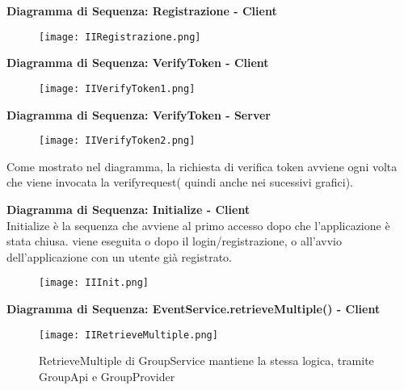 \textbf{Diagramma di Sequenza: Registrazione - Client}\\
\begin{figure}[h!]
    \begin{center}
        \texttt{[image: IIRegistrazione.png]}
    \end{center}
\end{figure}


\textbf{Diagramma di Sequenza: VerifyToken - Client}\\
\begin{figure}[h!]
    \begin{center}
        \texttt{[image: IIVerifyToken1.png]}
    \end{center}
\end{figure}
\clearpage
\textbf{Diagramma di Sequenza: VerifyToken - Server}\\
\begin{figure}[h!]
    \begin{center}
        \texttt{[image: IIVerifyToken2.png]}
    \end{center}
\end{figure}

Come mostrato nel diagramma, la richiesta di verifica token avviene ogni volta che viene invocata la verifyrequest( quindi anche nei sucessivi grafici).
\clearpage

\textbf{Diagramma di Sequenza: Initialize - Client}\\
Initialize è la sequenza che avviene al primo accesso dopo che l'applicazione è stata chiusa. viene eseguita o dopo il login/registrazione, o all'avvio dell'applicazione con un utente già registrato.
\begin{figure}[h!]
    \begin{center}
        \texttt{[image: IIInit.png]}
    \end{center}
\end{figure}

\textbf{Diagramma di Sequenza: EventService.retrieveMultiple() - Client}\\
\begin{figure}[h!]
    \begin{center}
        \begin{minipage}{0.5\textwidth}
            \texttt{[image: IIRetrieveMultiple.png]}
        \end{minipage}
        \begin{minipage}{0.4\textwidth}
            RetrieveMultiple di GroupService mantiene la stessa logica, tramite GroupApi e GroupProvider
        \end{minipage}
    \end{center}
\end{figure}
\clearpage

